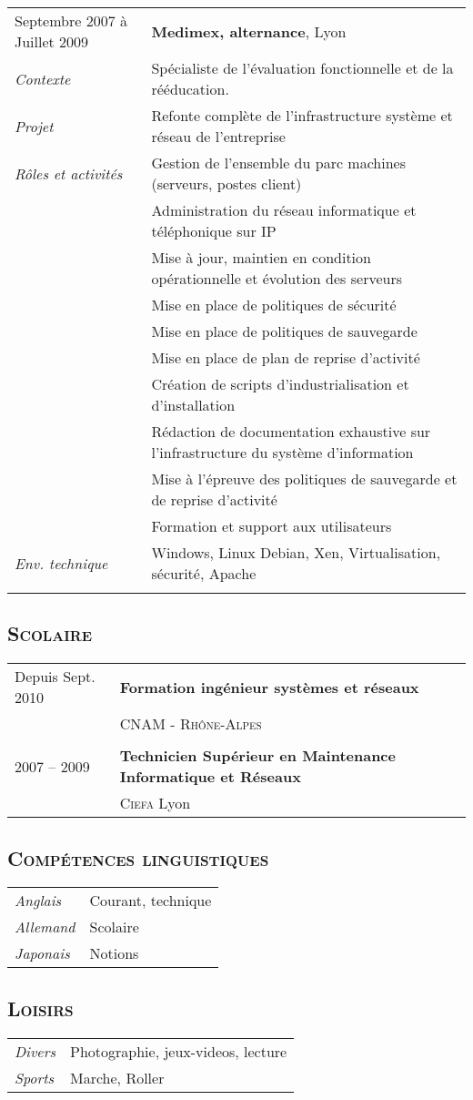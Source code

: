 \documentclass[a4paper,8pt]{article}
\newcommand{\hsubsection}[1]{\subsection*{\fontfamily{phv}\selectfont\textsc{#1}}}
\begin{document}
\begin{tabular}{P{3.5cm}|p{13cm}}
Septembre 2007 à Juillet 2009	& \textbf{Medimex, alternance}, Lyon\\
\textsl{Contexte}		& Spécialiste de l’évaluation fonctionnelle et de la rééducation.\\
\textsl{Projet}			& Refonte complète de l'infrastructure système et réseau de l'entreprise\\
\textsl{Rôles et activités} 	& Gestion de l'ensemble du parc machines (serveurs, postes client)\\
				& Administration du réseau informatique et téléphonique sur IP\\
				& Mise à jour, maintien en condition opérationnelle et évolution des serveurs\\
				& Mise en place de politiques de sécurité\\
				& Mise en place de politiques de sauvegarde\\
				& Mise en place de plan de reprise d'activité\\
				& Création de scripts d'industrialisation et d'installation\\
				& Rédaction de documentation exhaustive sur l'infrastructure du système d'information\\
				& Mise à l'épreuve des politiques de sauvegarde et de reprise d'activité\\
				& Formation et support aux utilisateurs\\
\textsl{Env. technique}		& Windows, Linux Debian, Xen, Virtualisation, sécurité, Apache\\
 & \\
\end{tabular}

\hsubsection{Scolaire}
\begin{tabular}{P{3.5cm}|p{13cm}}
Depuis Sept. 2010		& \textbf{Formation ingénieur systèmes et réseaux}\\
	& \textsc{CNAM - Rhône-Alpes}\\
 & \\
2007 -- 2009 			& \textbf{Technicien Supérieur en Maintenance Informatique et Réseaux}\\
	& \textsc{Ciefa} Lyon\\
\end{tabular}

\hsubsection{Compétences linguistiques}
\begin{tabular}{P{3.5cm}|p{13cm}}
\textsl{Anglais}		& Courant, technique\\
\textsl{Allemand}		& Scolaire\\
\textsl{Japonais}		& Notions\\
\end{tabular}

\hsubsection{Loisirs}
\begin{tabular}{P{3.5cm}|p{13cm}}
\textsl{Divers}			& Photographie, jeux-videos, lecture\\
\textsl{Sports}			& Marche, Roller\\
\end{tabular}
\end{document}
